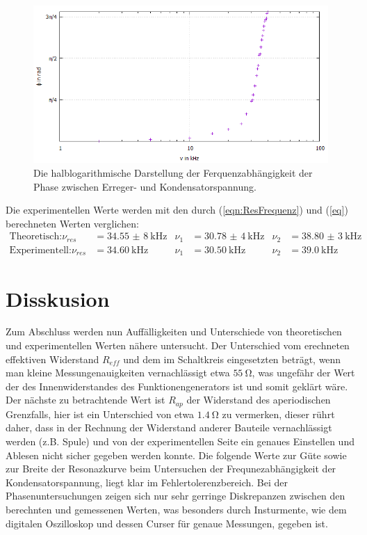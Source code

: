 \documentclass{scrartcl}
\begin{document}
     \begin{figure}
       \centering
       \includegraphics[width=\textwidth]{Halblog2.jpeg}
       \caption{Die halblogarithmische Darstellung der Ferquenzabhängigkeit der Phase zwischen Erreger- und Kondensatorspannung.}
       \label{fig:Halb2}
     \end{figure}
     \newpage
     Die experimentellen Werte werden mit den durch (\ref{eqn:ResFrequenz}) und (\ref{eq}) berechneten Werten verglichen:
     \begin{align*}
       \text{Theoretisch:}\nu_{res} &= \SI{34,55(8)}{\kilo\hertz} & \nu_1 &= \SI{30,78(4)}{\kilo\hertz} & \nu_2 &= \SI{38,80(3)}{\kilo\hertz}\\
       \text{Experimentell:}\nu_{res} &= \SI{34,60}{\kilo\hertz} & \nu_1 &= \SI{30,50}{\kilo\hertz} & \nu_2 &= \SI{39,0}{\kilo\hertz}
     \end{align*}

     \section{Disskusion}
     \label{sec:Disskusion}
   Zum Abschluss werden nun Auffälligkeiten und Unterschiede von theoretischen und experimentellen Werten nähere untersucht.
   Der Unterschied vom erechneten effektiven Widerstand $R_{eff}$ und dem im Schaltkreis eingesetzten beträgt, wenn man kleine Messungenauigkeiten vernachlässigt
   etwa $\SI{55}{\ohm}$, was ungefähr der Wert der des Innenwiderstandes des Funktionengenerators ist und somit geklärt wäre.
   Der nächste zu betrachtende Wert ist $R_{ap}$ der Widerstand des aperiodischen Grenzfalls, hier ist ein Unterschied von etwa $\SI{1,4}{\ohm}$ zu vermerken, dieser rührt daher,
   dass in der Rechnung der Widerstand anderer Bauteile vernachlässigt werden (z.B. Spule) und von der experimentellen Seite ein genaues Einstellen und Ablesen nicht sicher gegeben werden konnte.
   Die folgende Werte zur Güte sowie zur Breite der Resonazkurve beim Untersuchen der Frequnezabhängigkeit der Kondensatorspannung, liegt klar im Fehlertolerenzbereich.
   Bei der Phasenuntersuchungen zeigen sich nur sehr gerringe Diskrepanzen zwischen den berechnten und gemessenen Werten, was besonders durch Insturmente, wie dem digitalen Oszilloskop und dessen Curser für genaue Messungen, gegeben ist.
\printbibliography
\end{document}
